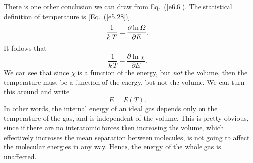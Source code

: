 There is one other conclusion we can draw from Eq.~(\ref{e6.6}). The statistical
definition of temperature is [Eq.~(\ref{e5.28})]
\begin{equation}
\frac{1}{k\,T} = \frac{\partial \ln {\mit\Omega}}{\partial E}.
\end{equation}
It follows that 
\begin{equation}
\frac{1}{k\,T} = \frac{\partial \ln \chi}{\partial E}.
\end{equation}
We can see that since $\chi$ is a function of the energy, but {\em not}\/ the volume,
 then
the temperature must be  a function of the
energy, but not the volume. We can turn this around and write
\begin{equation}
E = E(T).
\end{equation}
In other words, the internal energy of an ideal gas depends only on the temperature 
of the gas, and is independent of the volume. 
This is pretty obvious, since if there are no interatomic forces
then increasing the volume, which 
effectively increases the mean separation between molecules,
is not going to affect the molecular energies in any way. Hence, the energy of the
whole gas is unaffected. 

